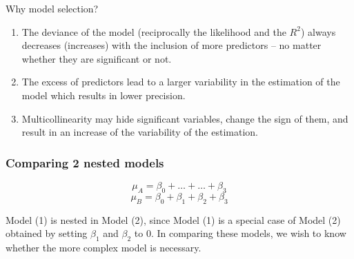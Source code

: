 \documentclass{beamer}
\begin{document}
%
\begin{frame}{Why model selection?}

\begin{enumerate}
	\item The deviance of the model (reciprocally the likelihood and the  $R^{2}$) always decreases (increases) with the inclusion of more predictors – no matter whether they are significant or not.
		\pause
	\item The excess of predictors lead to a larger variability in the estimation of the model which results in lower precision.
		\pause
	\item Multicollinearity may hide significant variables, change the sign of them, and result in an increase of the variability of the estimation.
\end{enumerate}
\end{frame}

\begin{frame}
\frametitle{Comparing 2 nested models}
	\begin{equation}
	\mu_{A} =\beta_{0}+ \ldots + \ldots + \beta_{3} 
	\end{equation}
	\begin{equation}
	\mu_{B} =\beta_{0}+ \beta_{1} + \beta_{2} + \beta_{3} 
	\end{equation}
	\pause

Model (1) is nested in Model (2), since Model (1) is a special case of Model (2) obtained by setting $\beta_{1}$ and $\beta_{2}$ to 0.  In comparing these models, we wish to know whether the more complex model is necessary.
\end{frame}
\end{document}

